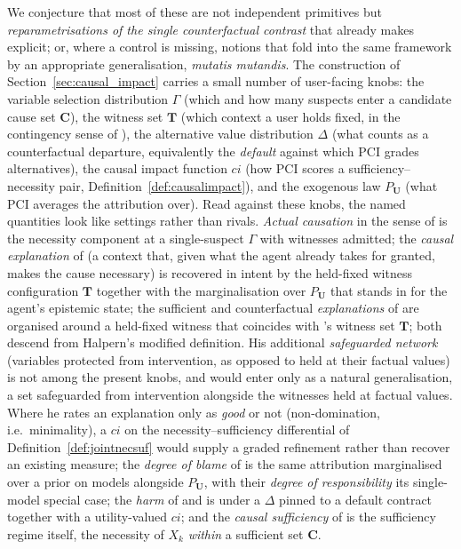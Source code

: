We conjecture that most of these are not independent primitives but
\emph{reparametrisations of the single counterfactual contrast} that \ourapproach already
makes explicit; or, where a control is missing, notions that fold into the same framework by an
appropriate generalisation, \emph{mutatis mutandis}. The construction of Section~\ref{sec:causal_impact} carries a small number of
user-facing knobs: the variable selection distribution $\Gamma$ (which and how many
suspects enter a candidate cause set $\mathbf{C}$), the witness set $\mathbf{T}$ (which
context a user holds fixed, in the contingency sense of \citealp{actualCausalityHalpern}), the
alternative value distribution $\Delta$ (what counts as a counterfactual departure,
equivalently the \emph{default} against which PCI grades alternatives), the causal impact
function $ci$ (how PCI scores a sufficiency--necessity pair,
Definition~\ref{def:causalimpact}), and the exogenous law $P_{\mathbf{U}}$ (what PCI
averages the attribution over). Read against these knobs, the named quantities look like
settings rather than rivals. \emph{Actual causation} in the sense of
\citet{actualCausalityHalpern} is the necessity component at a single-suspect $\Gamma$ with
witnesses admitted; the \emph{causal explanation} of \citet{actualCausalityHalpern} (a
context that, given what the agent already takes for granted, makes the cause necessary)
is recovered in intent by the held-fixed witness configuration $\mathbf{T}$ together with the
marginalisation over $P_{\mathbf{U}}$ that stands in for the agent's epistemic state; the
sufficient and counterfactual \emph{explanations} of \citet{beckersExplanationsXAI2022} are
organised around a held-fixed witness that coincides with \ourapproach's witness set
$\mathbf{T}$; both descend from Halpern's modified definition. His additional
\emph{safeguarded network} (variables protected from intervention, as opposed to held at their
factual values) is not among the present knobs, and would enter only as a natural
generalisation, a set safeguarded from intervention alongside the witnesses held at factual
values. Where he rates an
explanation only as \emph{good} or not (non-domination, i.e.\ minimality), a $ci$ on the
necessity--sufficiency differential of Definition~\ref{def:jointnecsuf} would supply a graded
refinement rather than recover an existing measure; the \emph{degree of blame} of
\citet{chocklerResponsibilityBlameStructuralModel2004} is the same
attribution marginalised over a prior on models alongside $P_{\mathbf{U}}$, with their
\emph{degree of responsibility} its single-model special case; the \emph{harm} of \citet{beckersHarm2022}
and \citet{beckersQuantifyingHarm2023} is \ourapproach under a $\Delta$ pinned to a default
contract together with a utility-valued $ci$; and the \emph{causal sufficiency} of
\citet{beckersSufficiency2021} is the sufficiency regime itself, the necessity of $X_k$
\emph{within} a sufficient set $\mathbf{C}$.

